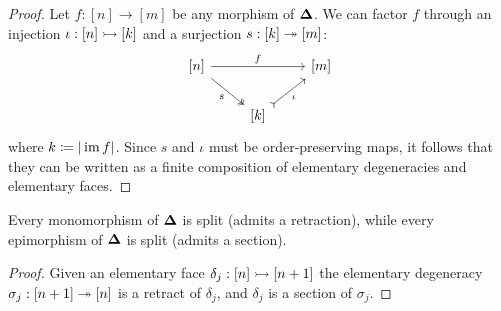 \begin{proof}
Let \(f: [n] \to [m]\) be any morphism of \({\mathbf{\Delta}}\). We can factor \(f\) through
an injection \(\iota: [n] \rightarrowtail [k]\) and a surjection \(s: [k] \twoheadrightarrow [m]\):
\[
\begin{tikzcd}
{[n]} \ar[rr, "f"] \ar[dr, two heads, "s"'] &&{[m]} \\
&{[k]} \ar[ru, tail, "\iota"'] &
\end{tikzcd}
\]
where \(k \coloneq |\operatorname{im} f|\). Since \(s\) and \(\iota\) must be order-preserving
maps, it follows that they can be written as a finite composition of elementary
degeneracies and elementary faces.
\end{proof}

\begin{corollary}
\label{cor:mono-and-epi-in-Splx-are-split-mono-and-epi}
Every monomorphism of \({\mathbf{\Delta}}\) is split (admits a retraction),
while every epimorphism of \({\mathbf{\Delta}}\) is split (admits a section).
\end{corollary}

\begin{proof}
Given an elementary face \(\delta_j: [n] \rightarrowtail [n+1]\) the elementary degeneracy
\(\sigma_j: [n+1] \twoheadrightarrow [n]\) is a retract of \(\delta_j\), and \(\delta_j\) is a
section of \(\sigma_j\).
\end{proof}

